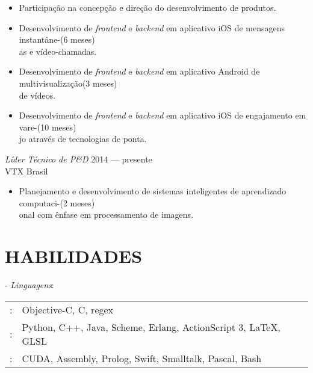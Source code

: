 \documentclass[]{res} %
\newcommand{\sbt}{\,\begin{picture}(-1,1)(-2,-3)\circle*{2}\end{picture}\ }
\def \divspace{6pt}
\def \myitemback{0.55cm}
\def \myitemsep{0pt}
\def \mypositionface{\sl}
\def \myorgface{\sc}
\begin{document}
\begin{resume}
\begin{itemize}[itemsep=\myitemsep,leftmargin=\myitemback]
\item[\sbt] Participação na concepção e direção do desenvolvimento de produtos.
\item[\sbt] Desenvolvimento de {\it frontend} e {\it backend} em aplicativo iOS de mensagens instantâne-\hfill(6 meses)\\as e vídeo-chamadas.
\item[\sbt] Desenvolvimento de {\it frontend} e {\it backend} em aplicativo Android de multivisualização\hfill(3 meses)\\ de vídeos.
\item[\sbt] Desenvolvimento de {\it frontend} e {\it backend} em aplicativo iOS de engajamento em vare-\hfill(10 meses)\\jo através de tecnologias de ponta.
\end{itemize}

{\mypositionface Líder Técnico de P\&D} \hfill 2014 — presente \\
{\myorgface VTX Brasil}

\begin{itemize}[itemsep=\myitemsep,leftmargin=\myitemback]
\item[\sbt] Planejamento e desenvolvimento de sistemas inteligentes de aprendizado computaci-\hfill(2 meses)\\onal com ênfase em processamento de imagens.
\end{itemize}

\section{HABILIDADES \hspace{\divspace} }

- {\sl Linguagens}: \\
\setlength\tabcolsep{2pt}
\begin{tabular}{l l}
\hspace*{1em}{\it Fluente}:& Objective-C, C, regex \\
\hspace*{1em}{\it Muito Familiar}:& Python, C++, Java, Scheme, Erlang, ActionScript 3, \LaTeX, GLSL \\
\hspace*{1em}{\it Pouco Familiar}:& CUDA, Assembly, Prolog, Swift, Smalltalk, Pascal, Bash \\
\end{tabular}


\end{resume}
\end{document}
